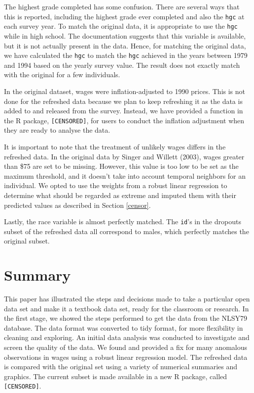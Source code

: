 \documentclass{article}
\begin{document}
The highest grade completed has some confusion. There are several ways that this is reported, including the highest grade ever completed and also the \texttt{hgc} at each survey year. To match the original data, it is appropriate to use the \texttt{hgc} while in high school. The documentation suggests that this variable is available, but it is not actually present in the data. Hence, for matching the original data, we have calculated the \texttt{hgc} to match the \texttt{hgc} achieved in the years between 1979 and 1994 based on the yearly survey value. The result does not exactly match with the original for a few individuals.

In the original dataset, wages were inflation-adjusted to 1990 prices. This is not done for the refreshed data because we plan to keep refreshing it as the data is added to and released from the survey. Instead, we have provided a function in the R package, \texttt{[CENSORED]}, for users to conduct the inflation adjustment when they are ready to analyse the data.

It is important to note that the treatment of unlikely wages differs in the refreshed data. In the original data by Singer and Willett (2003), wages greater than \$75 are set to be missing. However, this value is too low to be set as the maximum threshold, and it doesn't take into account temporal neighbors for an individual. We opted to use the weights from a robust linear regression to determine what should be regarded as extreme and imputed them with their predicted values as described in Section \ref{censor}.

Lastly, the race variable is almost perfectly matched. The \texttt{id}'s in the dropouts subset of the refreshed data all correspond to males, which perfectly matches the original subset.

\hypertarget{summary}{%
\section{Summary}\label{summary}}

This paper has illustrated the steps and decisions made to take a particular open data set and make it a textbook data set, ready for the classroom or research. In the first stage, we showed the steps performed to get the data from the NLSY79 database. The data format was converted to tidy format, for more flexibility in cleaning and exploring. An initial data analysis was conducted to investigate and screen the quality of the data. We found and provided a fix for many anomalous observations in wages using a robust linear regression model. The refreshed data is compared with the original set using a variety of numerical summaries and graphics. The current subset is made available in a new R package, called \texttt{[CENSORED]}.
\end{document}
